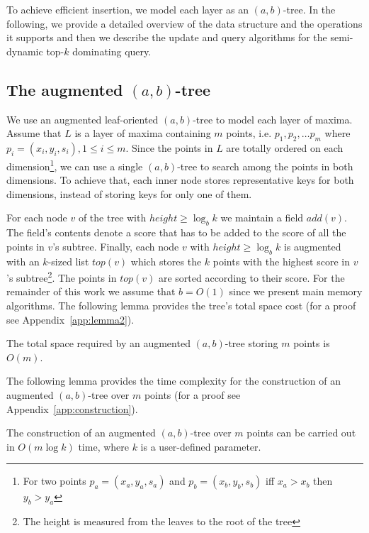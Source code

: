 \documentclass{llncs}
\begin{document}
To achieve efficient insertion, we model each layer as an $(a,b)$-tree. In the following, we provide a detailed overview of the data structure and the operations it supports and then we describe the update and query algorithms for the semi-dynamic top-$k$ dominating query.




\subsection{The augmented $(a,b)$-tree} \label{subsection:AugABTree}
We use an augmented leaf-oriented $(a,b)$-tree to model each layer of maxima. Assume that $L$ is a layer of maxima containing $m$ points, i.e. $p_1, p_2,\ldots p_m$ where $p_i=(x_{i},y_{i},s_i),1\leq i\leq m$. Since the points in $L$ are totally ordered on each dimension\footnote{For two points $p_a=(x_{a},y_{a},s_a)$ and $p_b=(x_{b},y_{b},s_b)$ iff $x_{a} > x_{b}$ then $y_{b} > y_{a}$}, we can use a single $(a,b)$-tree to search among the points in both dimensions. To achieve that, each inner node stores representative keys for both dimensions, instead of storing keys for only one of them.

For each node $v$ of the tree with $height \geq \log_{b}{k}$ we maintain a field $add(v)$. The field's contents denote a score that has to be added to the score of all the points in $v$'s subtree. Finally, each node $v$ with $height \geq \log_{b}{k}$ is augmented with an $k$-sized list $top(v)$ which stores the $k$ points with the highest score in $v$'s subtree\footnote{The height is measured from the leaves to the root of the tree}. The points in $top(v)$ are sorted according to their score. For the remainder of this work we assume that $b=O(1)$ since we present main memory algorithms. The following lemma provides the tree's total space cost (for a proof see Appendix~\ref{app:lemma2}).
\begin{lemma} \label{lemma:AugABTreeTotalSpace}
The total space required by an augmented $(a,b)$-tree storing $m$ points is $O(m)$.
\end{lemma}


The following lemma provides the time complexity for the construction of an augmented $(a,b)$-tree over $m$ points (for a proof see Appendix~\ref{app:construction}).
\begin{lemma} \label{lemma:construction}
The construction of an augmented $(a,b)$-tree over $m$ points can be carried out in $O(m\log{k})$ time, where $k$ is a user-defined parameter.
\end{lemma}
\end{document}
